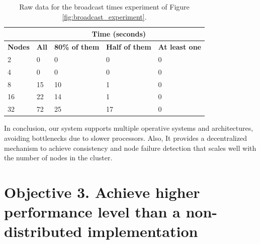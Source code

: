 \begin{table}[h!]
\centering
\begin{tabular}{l|l|l|l|l}
\cline{2-5}
                                     & \multicolumn{4}{c|}{\textbf{Time (seconds)}}                                                            \\ \hline
\multicolumn{1}{|l|}{\textbf{Nodes}} & \textbf{All} & \textbf{80\% of them} & \textbf{Half of them} & \multicolumn{1}{r|}{\textbf{At least one}} \\ \hline
\multicolumn{1}{|l|}{2}              & 0            & 0                    & 0                     & \multicolumn{1}{l|}{0}                    \\ \hline
\multicolumn{1}{|l|}{4}              & 0            & 0                    & 0                     & \multicolumn{1}{l|}{0}                    \\ \hline
\multicolumn{1}{|l|}{8}              & 15           & 10                   & 1                     & \multicolumn{1}{l|}{0}                    \\ \hline
\multicolumn{1}{|l|}{16}             & 22           & 14                   & 1                     & \multicolumn{1}{l|}{0}                    \\ \hline
\multicolumn{1}{|l|}{32}             & 72           & 25                   & 17                    & \multicolumn{1}{l|}{0}                    \\ \hline
\end{tabular}
\caption{Raw data for the broadcast times experiment of Figure \ref{fig:broadcast_experiment}.}
\label{tab:boadcast_experiment}
\end{table}

In conclusion, our system supports multiple operative systems and architectures, avoiding bottlenecks due to slower processors. Also, It provides a decentralized mechanism to achieve consistency and node failure detection that scales well with the number of nodes in the cluster.


\section{Objective 3. Achieve higher performance level than a non-distributed implementation}

